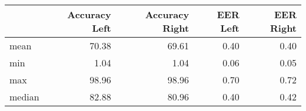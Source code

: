 \begin{tabular}{lrrrr}
\toprule
{} &  Accuracy Left &  Accuracy Right &  EER Left &  EER Right \\
\midrule
mean   &          70.38 &           69.61 &      0.40 &       0.40 \\
min    &           1.04 &            1.04 &      0.06 &       0.05 \\
max    &          98.96 &           98.96 &      0.70 &       0.72 \\
median &          82.88 &           80.96 &      0.40 &       0.42 \\
\bottomrule
\end{tabular}
